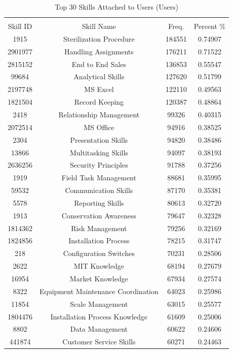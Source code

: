\documentclass[12pt]{article}
\begin{document}
\begin{table}[]
    \caption{Top 30 Skills Attached to Users (Users)}
    \centering
    \begin{tabular}{cccc}
\hline
\hline
\vspace{-0.4cm}
\\

Skill ID & Skill Name & Freq.  & Percent \% \\
\hline
1915 & Sterilization Procedure & 184551 & 0.74907 \\
2901977 & Handling Assignments & 176211 & 0.71522 \\
2815152 & End to End Sales & 136853 & 0.55547 \\
99684 & Analytical Skills & 127620 & 0.51799 \\
2197748 & MS Excel & 122110 & 0.49563 \\
1821504 & Record Keeping & 120387 & 0.48864 \\
2418 & Relationship Management & 99326 & 0.40315 \\
2072514 & MS Office & 94916 & 0.38525 \\
2304 & Presentation Skills & 94820 & 0.38486 \\
13866 & Multitasking Skills & 94097 & 0.38193 \\
2636256 & Security Principles & 91788 & 0.37256 \\
1919 & Field Task Management & 88681 & 0.35995 \\
59532 & Communication Skills & 87170 & 0.35381 \\
5578 & Reporting Skills & 80613 & 0.32720 \\
1913 & Conservation Awareness & 79647 & 0.32328 \\
1814362 & Risk Management & 79256 & 0.32169 \\
1824856 & Installation Process & 78215 & 0.31747 \\
218 & Configuration Switches & 70231 & 0.28506 \\
2622 & MIT Knowledge & 68194 & 0.27679 \\
16954 & Market Knowledge & 67934 & 0.27574 \\
8322 & Equipment Maintenance Coordination & 64023 & 0.25986 \\
11854 & Scale Management & 63015 & 0.25577 \\
1804476 & Installation Process Knowledge & 61609 & 0.25006 \\
8802 & Data Management & 60622 & 0.24606 \\
441874 & Customer Service Skills & 60271 & 0.24463 \\

\end{tabular}
\end{table}
\end{document}
